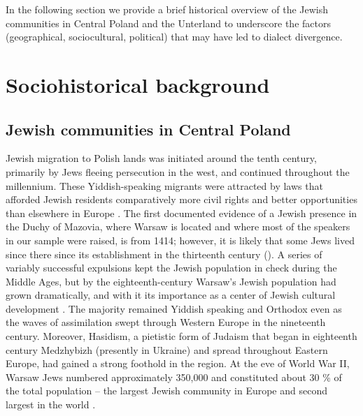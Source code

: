 \documentclass[output=paper,colorlinks,citecolor=brown]{langscibook}
\begin{document}
In the following section we provide a brief historical overview of the Jewish communities in Central Poland and the Unterland to underscore the factors (geographical, sociocultural, political) that may have led to dialect divergence. 

\section{Sociohistorical background}
\label{sec:nove:3}
\subsection{Jewish communities in Central Poland}
\label{sec:nove:3.1}

Jewish migration to Polish lands was initiated around the tenth century, primarily by Jews fleeing persecution in the west, and continued throughout the millennium. These Yiddish\hyp speaking migrants were attracted by laws that afforded Jewish residents comparatively more civil rights and better opportunities than elsewhere in Europe \citep{Weinryb1973}. The first documented evidence of a Jewish presence in the Duchy of Mazovia, where Warsaw is located and where most of the speakers in our sample were raised, is from 1414; however, it is likely that some Jews lived since there since its establishment in the thirteenth century (\citealt{Polonsky2010,Weinryb1973}). A series of variably successful expulsions kept the Jewish population in check during the Middle Ages, but by the eighteenth-century Warsaw's Jewish population had grown dramatically, and with it its importance as a center of Jewish cultural development \citep{Weinryb1973}. The majority remained Yiddish speaking and Orthodox even as the waves of assimilation swept through Western Europe in the nineteenth century. Moreover, Hasidism, a pietistic form of Judaism that began in eighteenth century Medzhybizh (presently in Ukraine) and spread throughout Eastern Europe, had gained a strong foothold in the region. At the eve of World War II, Warsaw Jews numbered approximately 350,000 and constituted about 30 \% of the total population -- the largest Jewish community in Europe and second largest in the world \citep{Polonsky2010}.
\end{document}
